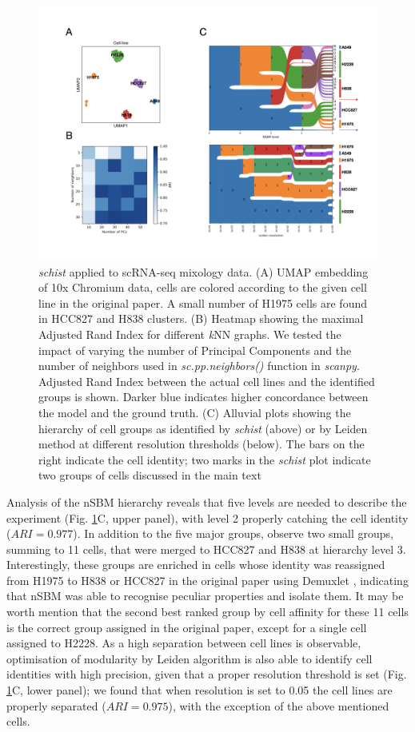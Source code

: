 \documentclass[10pt]{article}
\begin{document}
\begin{figure}[H]
\centering
\includegraphics[keepaspectratio,width=\textwidth,height=0.6\textheight]{Figure_1.png}
\caption[]{\emph{schist} applied to scRNA-seq mixology data. (A) UMAP embedding of 10x Chromium data, cells are colored according to the given cell line in the original paper. A small number of H1975 cells are found in HCC827 and H838 clusters. (B) Heatmap showing the maximal Adjusted Rand Index for different \emph{k}NN graphs. We tested the impact of varying the number of Principal Components and the number of neighbors used in \emph{sc.pp.neighbors()} function in \emph{scanpy}. Adjusted Rand Index between the actual cell lines and the identified groups is shown. Darker blue indicates higher concordance between the model and the ground truth. (C) Alluvial plots showing the hierarchy of cell groups as identified by \emph{schist} (above) or by Leiden method at different resolution thresholds (below). The bars on the right indicate the cell identity; two marks in the \emph{schist} plot indicate two groups of cells discussed in the main text}\label{Figure1}
\end{figure}

Analysis of the nSBM hierarchy reveals that five levels are needed to describe the experiment (Fig. \ref{Figure1}C, upper panel), with level 2 properly catching the cell identity ($ARI = 0.977$). In addition to the five major groups, observe two small groups, summing to 11 cells, that were merged to HCC827 and H838 at hierarchy level 3. Interestingly, these groups are enriched in cells whose identity was reassigned from H1975 to H838 or HCC827 in the original paper using Demuxlet \cite{kang_2018}, indicating that nSBM was able to recognise peculiar properties and isolate them. It may be worth mention that the second best ranked group by cell affinity for these 11 cells is the correct group assigned in the original paper, except for a single cell assigned to H2228.
As a high separation between cell lines is observable, optimisation of modularity by Leiden algorithm is also able to identify cell identities with high precision, given that a proper resolution threshold is set (Fig. \ref{Figure1}C, lower panel); we found that when resolution is set to 0.05 the cell lines are properly separated ($ARI = 0.975$), with the exception of the above mentioned cells.
\end{document}
